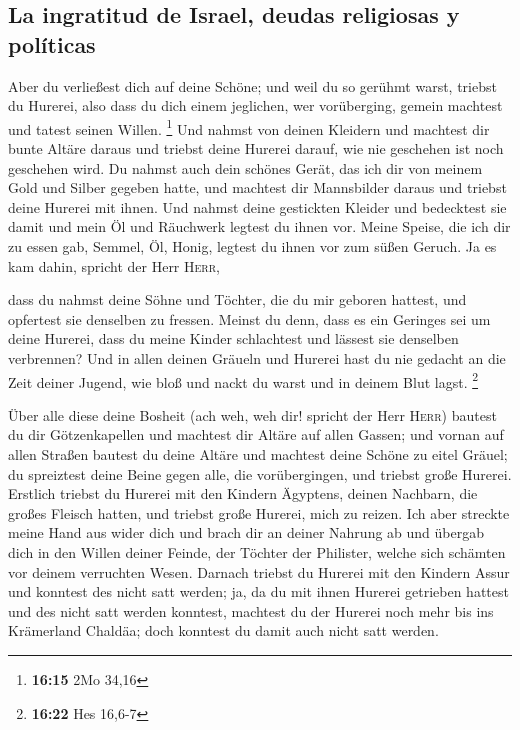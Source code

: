 \hypertarget{la-ingratitud-de-israel-deudas-religiosas-y-poluxedticas}{%
\subsection{La ingratitud de Israel, deudas religiosas y
políticas}\label{la-ingratitud-de-israel-deudas-religiosas-y-poluxedticas}}

 Aber du verließest dich auf deine Schöne; und weil du so
gerühmt warst, triebst du Hurerei, also dass du dich einem jeglichen,
wer vorüberging, gemein machtest und tatest seinen Willen. \footnote{\textbf{16:15}
  2Mo 34,16}  Und nahmst von deinen Kleidern und machtest
dir bunte Altäre daraus und triebst deine Hurerei darauf, wie nie
geschehen ist noch geschehen wird.  Du nahmst auch dein
schönes Gerät, das ich dir von meinem Gold und Silber gegeben hatte, und
machtest dir Mannsbilder daraus und triebst deine Hurerei mit ihnen.
 Und nahmst deine gestickten Kleider und bedecktest sie
damit und mein Öl und Räuchwerk legtest du ihnen vor. 
Meine Speise, die ich dir zu essen gab, Semmel, Öl, Honig, legtest du
ihnen vor zum süßen Geruch. Ja es kam dahin, spricht der Herr
\textsc{Herr},

 dass du nahmst deine Söhne und Töchter, die du mir
geboren hattest, und opfertest sie denselben zu fressen. Meinst du denn,
dass es ein Geringes sei um deine Hurerei,  dass du meine
Kinder schlachtest und lässest sie denselben verbrennen? 
Und in allen deinen Gräueln und Hurerei hast du nie gedacht an die Zeit
deiner Jugend, wie bloß und nackt du warst und in deinem Blut lagst.
\footnote{\textbf{16:22} Hes 16,6-7}

 Über alle diese deine Bosheit (ach weh, weh dir! spricht
der Herr \textsc{Herr})  bautest du dir Götzenkapellen
und machtest dir Altäre auf allen Gassen;  und vornan auf
allen Straßen bautest du deine Altäre und machtest deine Schöne zu eitel
Gräuel; du spreiztest deine Beine gegen alle, die vorübergingen, und
triebst große Hurerei.  Erstlich triebst du Hurerei mit
den Kindern Ägyptens, deinen Nachbarn, die großes Fleisch hatten, und
triebst große Hurerei, mich zu reizen.  Ich aber streckte
meine Hand aus wider dich und brach dir an deiner Nahrung ab und übergab
dich in den Willen deiner Feinde, der Töchter der Philister, welche sich
schämten vor deinem verruchten Wesen.  Darnach triebst du
Hurerei mit den Kindern Assur und konntest des nicht satt werden; ja, da
du mit ihnen Hurerei getrieben hattest und des nicht satt werden
konntest,  machtest du der Hurerei noch mehr bis ins
Krämerland Chaldäa; doch konntest du damit auch nicht satt werden.

